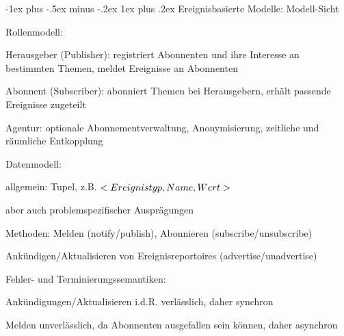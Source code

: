\documentclass[10pt]{article}
\makeatletter
\renewcommand{\subsubsection}{\@startsection{subsubsection}{3}{0mm}%
                                {-1ex plus -.5ex minus -.2ex}%
                                {1ex plus .2ex}%
                                {\normalfont\small\bfseries}}
\makeatother
\begin{document}
\subsubsection{Ereignisbasierte Modelle: Modell-Sicht}
\begin{itemize*}
  \item Rollenmodell:
  \begin{itemize*}
    \item Herausgeber (Publisher): registriert Abonnenten und ihre Interesse an bestimmten Themen, meldet Ereignisse an Abonnenten
    \item Abonnent (Subscriber): abonniert Themen bei Herausgebern, erhält passende Ereignisse zugeteilt
    \item Agentur: optionale Abonnementverwaltung, Anonymisierung, zeitliche und räumliche Entkopplung
  \end{itemize*}
  \item Datenmodell:
  \begin{itemize*}
    \item allgemein: Tupel, z.B. $<Ereignistyp,\space Name,\space Wert>$
    \item aber auch problemspezifischer Ausprägungen
    \item Methoden: Melden (notify/publish), Abonnieren (subscribe/unsubscribe)
    \item Ankündigen/Aktualisieren von Ereignisreportoires (advertise/unadvertise)
  \end{itemize*}
  \item Fehler- und Terminierungssemantiken:
  \begin{itemize*}
    \item Ankündigungen/Aktualisieren i.d.R. verlässlich, daher synchron
    \item Melden unverlässlich, da Abonnenten ausgefallen sein können, daher asynchron
  \end{itemize*}
\end{itemize*}
\end{document}
